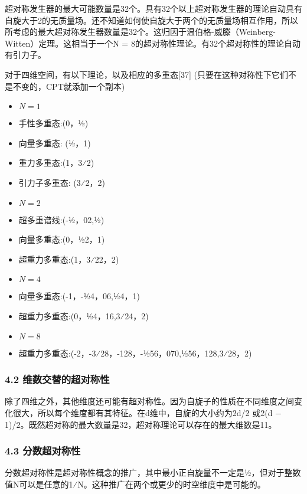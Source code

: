 超对称发生器的最大可能数量是32个。具有32个以上超对称发生器的理论自动具有自旋大于2的无质量场。还不知道如何使自旋大于两个的无质量场相互作用，所以所考虑的最大超对称发生器数量是32个。这归因于温伯格-威滕（Weinberg-Witten）定理。这相当于一个N = 8的超对称性理论。有32个超对称性的理论自动有引力子。

对于四维空间，有以下理论，以及相应的多重态[37] (只要在这种对称性下它们不是不变的，CPT就添加一个副本)
\begin{itemize}
\item $N = 1$
\item 手性多重态:(0，1⁄2)
\item 向量多重态: (1⁄2，1)
\item 重力多重态:(1，3⁄2)
\item 引力子多重态: (3⁄2，2)
\end{itemize}
\begin{itemize}
\item $N = 2$
\item 超多重谱线:(-1⁄2，02,1⁄2)
\item 向量多重态:(0，1⁄22，1)
\item 超重力多重态:(1，3⁄22，2)
\end{itemize}
\begin{itemize}
\item $N = 4$
\item 向量多重态:(-1，-1⁄24，06,1⁄24，1)
\item 超重力多重态:(0，1⁄24，16,3⁄24，2)
\end{itemize}
\begin{itemize}
\item $N = 8$
\item 超重力多重态:(-2，-3⁄28，-128，-1⁄256，070,1⁄256，128,3⁄28，2)
\end{itemize}
\subsubsection{4.2 维数交替的超对称性}
除了四维之外，其他维度还可能有超对称性。因为自旋子的性质在不同维度之间变化很大，所以每个维度都有其特征。在d维中，自旋的大小约为2d/2 或2(d − 1)/2。既然超对称的最大数量是32，超对称理论可以存在的最大维数是11。
\subsubsection{4.3 分数超对称性}
分数超对称性是超对称性概念的推广，其中最小正自旋量不一定是1⁄2，但对于整数值N可以是任意的1⁄N。这种推广在两个或更少的时空维度中是可能的。

